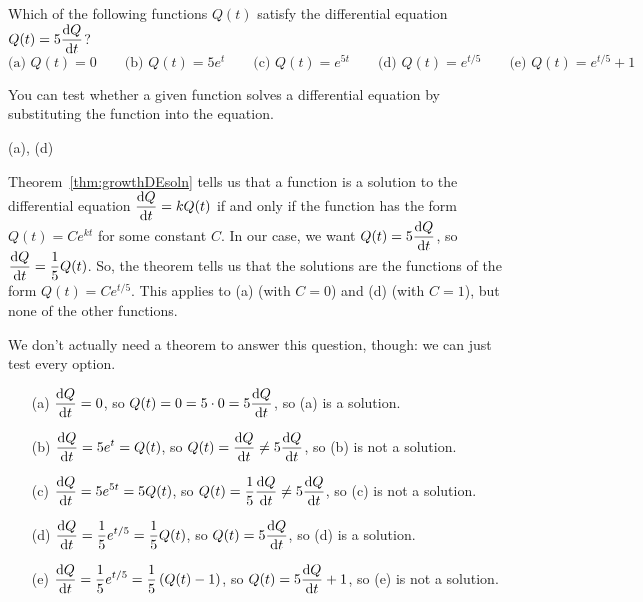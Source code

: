 \begin{Mquestion}
Which of the following functions $Q(t)$ satisfy the differential equation $Q(t)=5\ds\diff{Q}{t}$?
\[\mbox{(a) } Q(t)=0\qquad
\mbox{(b) } Q(t)=5e^t\qquad
\mbox{(c) } Q(t)=e^{5t}\qquad
\mbox{(d) } Q(t)=e^{t/5}\qquad
\mbox{(e) } Q(t)=e^{t/5}+1\]
\end{Mquestion}
\begin{hint}
You can test whether a given function solves a differential equation
      by substituting the function into the equation.
\end{hint}
\begin{answer} (a), (d)
\end{answer}
\begin{solution}
Theorem~\ref*{thm:growthDEsoln} tells us that a function is a solution to the differential equation $\ds\diff{Q}{t}=kQ(t)$ if and only if the function has the form $Q(t)=Ce^{kt}$ for some constant $C$. In our case, we want $Q(t)=5\ds\diff{Q}{t}$, so $\ds\diff{Q}{t}=\dfrac{1}{5}Q(t)$. So, the theorem tells us that the solutions are the functions of the form $Q(t)=Ce^{t/5}$. This applies to (a) (with $C=0$) and (d) (with $C=1$), but none of the other functions.

We don't actually need a theorem to answer this question, though: we can just test every option.
\begin{itemize}
\item[(a)] $\ds\diff{Q}{t}=0$, so $Q(t)=0=5\cdot 0 = 5\ds\diff{Q}{t}$, so (a) is a solution.
\item[(b)] $\ds\diff{Q}{t}=5e^t=Q(t)$, so $Q(t)=\ds\diff{Q}{t} \neq 5 \ds\diff{Q}{t}$, so (b) is not a solution.
\item[(c)] $\ds\diff{Q}{t}=5e^{5t}=5Q(t)$, so $Q(t)=\dfrac{1}{5}\ds\diff{Q}{t}\neq5\ds\diff{Q}{t}$, so (c) is not a solution.
\item[(d)] $\ds\diff{Q}{t}=\frac{1}{5}e^{t/5}=\frac{1}{5}Q(t)$, so
$Q(t)=5\ds\diff{Q}{t}$, so (d) is a solution.
\item[(e)] $\ds\diff{Q}{t}=\frac{1}{5}e^{t/5}=\frac{1}{5}\left(Q(t)-1\right)$, so
$Q(t)=5\ds\diff{Q}{t}+1$, so (e) is not a solution.
\end{itemize}
\end{solution}


